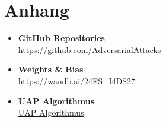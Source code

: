 \section{Anhang}



\begin{itemize}

    \item \textbf{GitHub Repositories} \\
    \href{https://github.com/AdversarialAttacks}{https://github.com/AdversarialAttacks}
    
    \item \textbf{Weights \& Bias} \\
    \href{https://wandb.ai/24FS_I4DS27}
    {https://wandb.ai/24FS\_I4DS27}
    
    \item \textbf{UAP Algorithmus} \\
    \href{https://github.com/AdversarialAttacks/report/blob/main/01-images/05-UAP_ALG.png}{UAP Algorithmus}
    
\end{itemize}